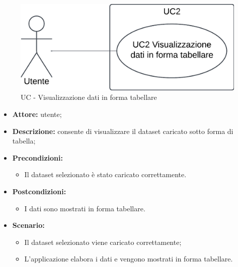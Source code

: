 \begin{figure}[h!]
    \centering
    \includegraphics[scale=0.7]{template/images/UC2.png}
    \caption{UC - Visualizzazione dati in forma tabellare}
\end{figure}
\begin{itemize}
    \item \textbf{Attore:} utente;
    \item \textbf{Descrizione:} consente di visualizzare il dataset caricato sotto forma di tabella;
    \item \textbf{Precondizioni:}
    \begin{itemize}
        \item Il dataset selezionato è stato caricato correttamente.
    \end{itemize}
    \item \textbf{Postcondizioni:}
    \begin{itemize}
        \item I dati sono mostrati in forma tabellare.
    \end{itemize}
    \item \textbf{Scenario:}
    \begin{itemize}
        \item Il dataset selezionato viene caricato correttamente;
        \item L'applicazione elabora i dati e vengono mostrati in forma tabellare.
    \end{itemize}
\end{itemize}



